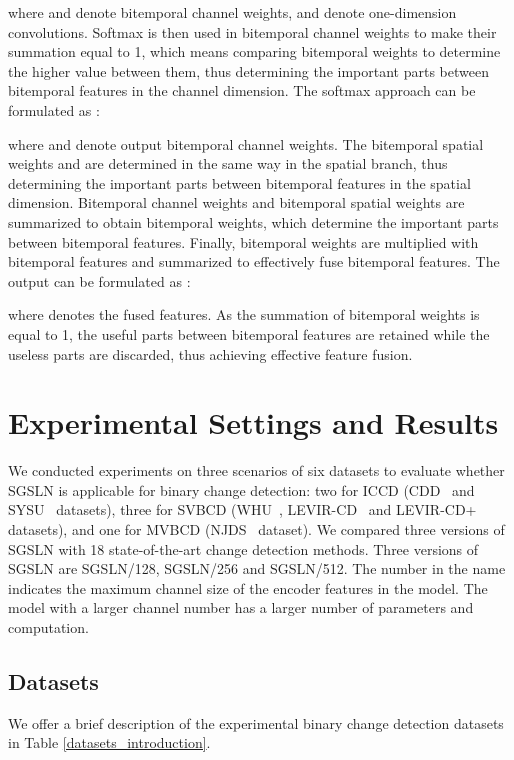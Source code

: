 \documentclass[journal]{IEEEtran}
\begin{document}
where  and  denote bitemporal channel weights,  and  denote one-dimension convolutions. Softmax is then used in bitemporal channel weights to make their summation equal to 1, which means comparing bitemporal weights to determine the higher value between them, thus determining the important parts between bitemporal features in the channel dimension. The softmax approach can be formulated as :

where  and  denote output bitemporal channel weights. The bitemporal spatial weights  and  are determined in the same way in the spatial branch, thus determining the important parts between bitemporal features in the spatial dimension. Bitemporal channel weights and bitemporal spatial weights are summarized to obtain bitemporal weights, which determine the important parts between bitemporal features. Finally, bitemporal weights are multiplied with bitemporal features and summarized to effectively fuse bitemporal features. The output can be formulated as :

where  denotes the fused features. As the summation of bitemporal weights is equal to 1, the useful parts between bitemporal features are retained while the useless parts are discarded, thus achieving effective feature fusion.





\section{Experimental Settings and Results}

We conducted experiments on three scenarios of six datasets to evaluate whether SGSLN is applicable for binary change detection: two for ICCD (CDD~\cite{cdd} and SYSU~\cite{sysu} datasets), three for SVBCD (WHU~\cite{whu}, LEVIR-CD~\cite{sta} and LEVIR-CD+ datasets), and one for MVBCD (NJDS~\cite{njds} dataset). We compared three versions of SGSLN with 18 state-of-the-art change detection methods. Three versions of SGSLN are SGSLN/128, SGSLN/256 and SGSLN/512. The number in the name indicates the maximum channel size of the encoder features in the model. The model with a larger channel number has a larger number of parameters and computation. 

\subsection{Datasets}

We offer a brief description of the experimental binary change detection datasets in Table \ref{datasets_introduction}. 
\end{document}
